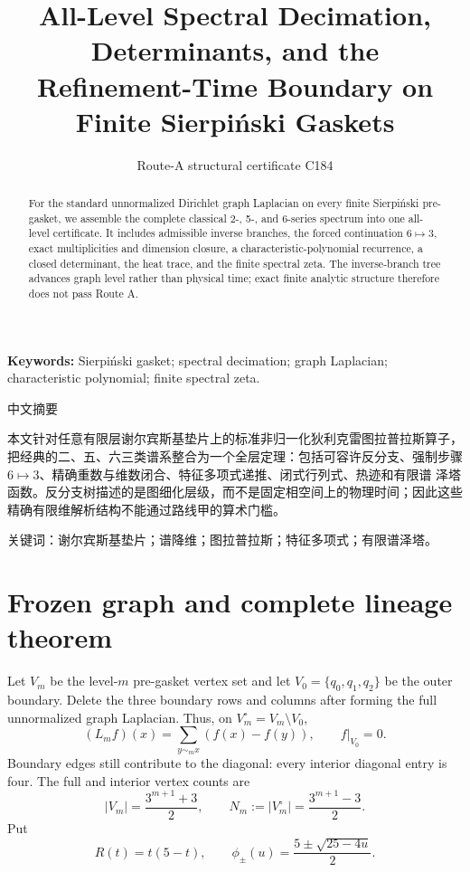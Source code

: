 \documentclass[9pt]{extarticle}
\title{All-Level Spectral Decimation, Determinants, and the\\
Refinement-Time Boundary on Finite Sierpiński Gaskets}
\author{Route-A structural certificate C184}
\date{}
\begin{document}
\maketitle
\begin{abstract}
For the standard unnormalized Dirichlet graph Laplacian on every finite
Sierpiński pre-gasket, we assemble the complete classical 2-, 5-, and
6-series spectrum into one all-level certificate.  It includes admissible
inverse branches, the forced continuation $6\mapsto3$, exact multiplicities
and dimension closure, a characteristic-polynomial recurrence, a closed
determinant, the heat trace, and the finite spectral zeta.  The inverse-branch
tree advances graph level rather than physical time; exact finite analytic
structure therefore does not pass Route A.
\end{abstract}
\noindent\textbf{Keywords:} Sierpiński gasket; spectral decimation; graph
Laplacian; characteristic polynomial; finite spectral zeta.

\begin{otherlanguage}{chinese-simplified}
\begin{center}{\large 中文摘要}\end{center}
本文针对任意有限层谢尔宾斯基垫片上的标准非归一化狄利克雷图拉普拉斯算子，
把经典的二、五、六三类谱系整合为一个全层定理：包括可容许反分支、强制步骤
$6\mapsto3$、精确重数与维数闭合、特征多项式递推、闭式行列式、热迹和有限谱
泽塔函数。反分支树描述的是图细化层级，而不是固定相空间上的物理时间；因此这些
精确有限维解析结构不能通过路线甲的算术门槛。

\noindent 关键词：谢尔宾斯基垫片；谱降维；图拉普拉斯；特征多项式；有限谱泽塔。
\end{otherlanguage}

\section{Frozen graph and complete lineage theorem}
Let $V_m$ be the level-$m$ pre-gasket vertex set and let
$V_0=\{q_0,q_1,q_2\}$ be the outer boundary.  Delete the three boundary rows
and columns after forming the full unnormalized graph Laplacian.  Thus, on
$V_m^\circ=V_m\setminus V_0$,
\[
 (L_mf)(x)=\sum_{y\sim_mx}(f(x)-f(y)),\qquad f|_{V_0}=0.
\]
Boundary edges still contribute to the diagonal: every interior diagonal
entry is four.  The full and interior vertex counts are
\[
 |V_m|=\frac{3^{m+1}+3}{2},\qquad
 N_m:=|V_m^\circ|=\frac{3^{m+1}-3}{2}.
\]
Put
\[
 R(t)=t(5-t),\qquad
 \phi_\pm(u)=\frac{5\pm\sqrt{25-4u}}2.
\]
\end{document}
